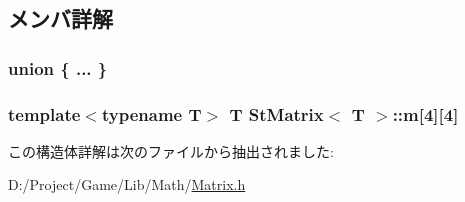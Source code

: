 \subsection{メンバ詳解}
\hypertarget{struct_st_matrix_a7d13406dfcdce08cfbc8f2aeb268a2bd}{}\subsubsection[{"@1}]{\setlength{\rightskip}{0pt plus 5cm}union \{ ... \} }\label{struct_st_matrix_a7d13406dfcdce08cfbc8f2aeb268a2bd}
\hypertarget{struct_st_matrix_aaa8be0e27308c6a8a9477927596364c3}{}
\subsubsection[{m}]{\setlength{\rightskip}{0pt plus 5cm}template$<$typename T$>$ T {\bf St\+Matrix}$<$ T $>$\+::m\mbox{[}4\mbox{]}\mbox{[}4\mbox{]}}\label{struct_st_matrix_aaa8be0e27308c6a8a9477927596364c3}


この構造体詳解は次のファイルから抽出されました\+:\begin{DoxyCompactItemize}
\item 
D\+:/\+Project/\+Game/\+Lib/\+Math/\hyperlink{_matrix_8h}{Matrix.\+h}\end{DoxyCompactItemize}
